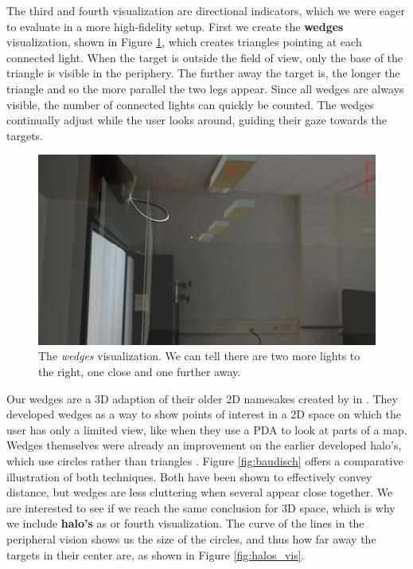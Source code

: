 The third and fourth visualization are directional indicators, which we were eager to evaluate in a more high-fidelity setup. First we create the \textbf{wedges} visualization, shown in Figure \ref{fig:wedges_vis}, which creates triangles pointing at each connected light. When the target is outside the field of view, only the base of the triangle is visible in the periphery. The further away the target is, the longer the triangle and so the more parallel the two legs appear. Since all wedges are always visible, the number of connected lights can quickly be counted. The wedges continually adjust while the user looks around, guiding their gaze towards the targets.

\begin{figure}
    \centering
    \includegraphics[width=1.0\linewidth]{resources/implementation/wedges.jpg}
    \caption{The \textit{wedges} visualization. We can tell there are two more lights to the right, one close and one further away.}
    \label{fig:wedges_vis}
\end{figure}

Our wedges are a 3D adaption of their older 2D namesakes created by \cite{gustafson2008wedge} in \citeyear{gustafson2008wedge} \cite{gustafson2008wedge}. They developed wedges as a way to show points of interest in a 2D space on which the user has only a limited view, like when they use a PDA to look at parts of a map. Wedges themselves were already an improvement on the earlier developed halo's, which use circles rather than triangles \cite{baudisch1993halo}. Figure \ref{fig:baudisch} offers a comparative illustration of both techniques. Both have been shown to effectively convey distance, but wedges are less cluttering when several appear close together.  We are interested to see if we reach the same conclusion for 3D space, which is why we include \textbf{halo's} as or fourth visualization. The curve of the lines in the peripheral vision shows us the size of the circles, and thus how far away the targets in their center are, as shown in Figure \ref{fig:halos_vis}.

